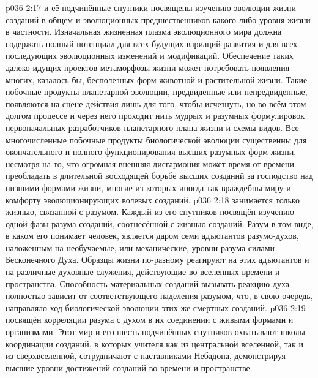\vs p036 2:17 \pc {} и её подчинённые спутники посвящены изучению эволюции жизни созданий в общем и эволюционных предшественников какого\hyp{}либо уровня жизни в частности. Изначальная жизненная плазма эволюционного мира должна содержать полный потенциал для всех будущих вариаций развития и для всех последующих эволюционных изменений и модификаций. Обеспечение таких далеко идущих проектов метаморфозы жизни может потребовать появления многих, казалось бы, бесполезных форм животной и растительной жизни. Такие побочные продукты планетарной эволюции, предвиденные или непредвиденные, появляются на сцене действия лишь для того, чтобы исчезнуть, но во всём этом долгом процессе и через него проходит нить мудрых и разумных формулировок первоначальных разработчиков планетарного плана жизни и схемы видов. Все многочисленные побочные продукты биологической эволюции существенны для окончательного и полного функционирования высших разумных форм жизни, несмотря на то, что огромная внешняя дисгармония может время от времени преобладать в длительной восходящей борьбе высших созданий за господство над низшими формами жизни, многие из которых иногда так враждебны миру и комфорту эволюционирующих волевых созданий.
\vs p036 2:18 \pc {} занимается только жизнью, связанной с разумом. Каждый из его спутников посвящён изучению одной фазы разума созданий, соотнесённой с жизнью созданий. Разум в том виде, в каком его понимает человек, является даром семи адъютантов разумо\hyp{}духов, наложенным на необучаемые, или механические, уровни разума силами Бесконечного Духа. Образцы жизни по\hyp{}разному реагируют на этих адъютантов и на различные духовные служения, действующие во вселенных времени и пространства. Способность материальных созданий вызывать реакцию духа полностью зависит от соответствующего наделения разумом, что, в свою очередь, направляло ход биологической эволюции этих же смертных созданий.
\vs p036 2:19 \pc {} посвящён корреляции разума с духом в их соединении с живыми формами и организмами. Этот мир и его шесть подчинённых спутников охватывают школы координации созданий, в которых учителя как из центральной вселенной, так и из сверхвселенной, сотрудничают с наставниками Небадона, демонстрируя высшие уровни достижений созданий во времени и пространстве.
